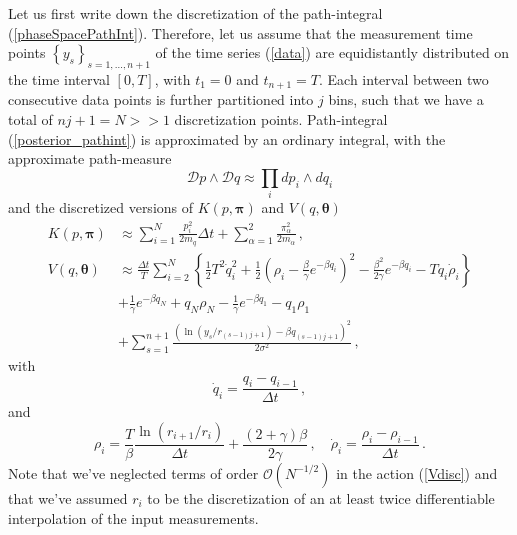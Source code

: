 \documentclass[11pt, a4paper]{article}
\newcommand{\bt}{\pmb\theta}
\begin{document}
Let us first write down the discretization of the path-integral (\ref{phaseSpacePathInt}).
Therefore, let us assume that the measurement time points $\left\{ y_s \right\}_{s=1,\dots, n+1}$ of the time series (\ref{data}) are equidistantly distributed on the time interval $[0,T]$, with $t_1=0$ and $t_{n+1}=T$.
Each interval between two consecutive data points is further partitioned into $j$ bins, such that we have a total of $nj+1=N>>1$ discretization points.
Path-integral (\ref{posterior_pathint}) is approximated by an ordinary integral, with the approximate path-measure 
\begin{equation}
  \mathcal Dp\wedge\mathcal Dq
  \approx
  \prod_i dp_i\wedge dq_i 
\end{equation}
and the discretized versions of $K( p,{\pmb\pi})$ and $V( q,\bt)$
\begin{align}
   K( p,{\pmb\pi})
   &\approx
   \sum_{i=1}^N
   \frac{ p_i^2}{2m_q}\Delta t
   +
   \sum_{\alpha=1}^2\frac{\pi_\alpha^2}{2m_\alpha}\,,\label{Kdisc}
   \\
   V(q,\bt)
   &\approx
   \frac{\Delta t}{T}
   \sum_{i=2}^{N}
   \left\{
    \frac{1}{2} 
    T^2 \dot q_i^2
    +
    \frac{1}{2}
     \left(
        \rho_i-\frac{\beta}{\gamma}e^{-\beta q_i}
     \right)^2
    -
    \frac{\beta^2}{2\gamma}
    e^{-\beta q_i}
   -
    T q_i\dot\rho_i
   \right\}
  \\
  &+
  \frac{1}{\gamma}
  e^{-\beta q_N}
  +
  q_N \rho_{N}
  -
  \frac{1}{\gamma}
  e^{-\beta q_1}
  -
  q_1 \rho_{1}
  \nonumber
  \\
  & +
  \sum_{s=1}^{n+1}
  \frac{(\ln(y_s/r_{(s-1)j+1}) - {\beta q_{(s-1)j+1}})^2}{2\sigma^2}
   \,,\label{Vdisc}
\end{align}
with
\begin{equation}
  \dot q_i = \frac{q_i-q_{i-1}}{\Delta t}\,,
\end{equation}
and
\begin{equation}\label{rhodisc}
\rho_i = \frac{T}{\beta} \frac{\ln(r_{i+1}/r_i)}{\Delta t}
+
\frac{(2+\gamma)\beta}{2\gamma}
\,,\quad
\dot\rho_i = \frac{\rho_i-\rho_{i-1}}{\Delta t}\,.
\end{equation}
Note that we've neglected terms of order $\mathcal O(N^{-1/2})$ in the action (\ref{Vdisc}) and that we've assumed $r_i$ to be the discretization of an at least twice differentiable interpolation of the input measurements.

\end{document}
